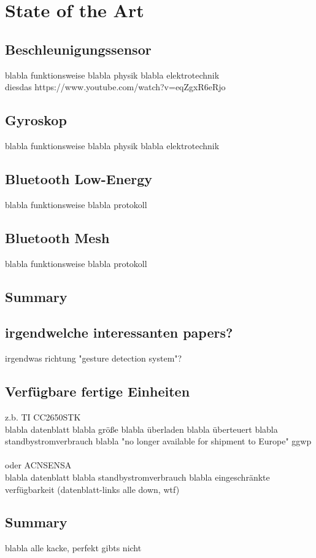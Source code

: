 \chapter{State of the Art}
\label{ch:background}

\section{Beschleunigungssensor}
blabla funktionsweise blabla physik blabla elektrotechnik\\
diesdas https://www.youtube.com/watch?v=eqZgxR6eRjo

\section{Gyroskop}
blabla funktionsweise blabla physik blabla elektrotechnik

\section{Bluetooth Low-Energy}
blabla funktionsweise blabla protokoll

\section{Bluetooth Mesh}
blabla funktionsweise blabla protokoll

\section{Summary}



\section{irgendwelche interessanten papers?}
irgendwas richtung "gesture detection system"?

\section{Verfügbare fertige Einheiten}
z.b. TI CC2650STK\\
blabla datenblatt blabla größe blabla überladen blabla überteuert blabla standbystromverbrauch blabla "no longer available for shipment to Europe" ggwp\\
\\
oder ACNSENSA\\
blabla datenblatt blabla standbystromverbrauch blabla eingeschränkte verfügbarkeit (datenblatt-links alle down, wtf)

\section{Summary}
blabla alle kacke,  perfekt gibts nicht
